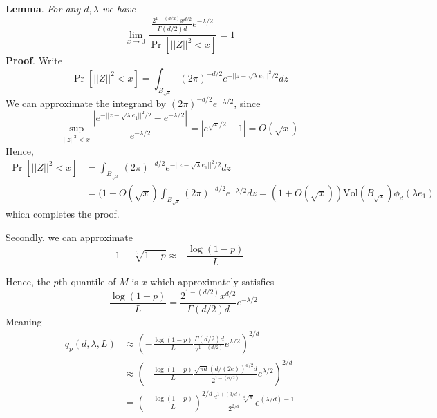 \documentclass[12pt]{article}
\begin{document}
\textbf{Lemma}.
\emph{ For any $d, \lambda$ we have
\[
\lim_{x \to 0} \frac{\frac{2^{1-(d/2)} x^{d/2}}{\Gamma(d/2) d} e^{-\lambda/2}}{\Pr[||Z||^2 < x]} = 1
\]
}
\textbf{Proof}.
Write
\[
\Pr[||Z||^2 < x] = \int_{B_{\sqrt{x}}} (2\pi)^{-d/2} e^{-||z - \sqrt{\lambda} e_1||^2/2} dz
\]
We can approximate the integrand by $(2\pi)^{-d/2} e^{-\lambda/2}$, since
\[
\sup_{||z||^2 < x} \frac{|e^{-||z - \sqrt{\lambda} e_1||^2/2} - e^{-\lambda/2}|}{e^{-\lambda/2}} = |e^{\sqrt{x}/2} - 1| = O(\sqrt{x})
\]
Hence,
\begin{align*}
\Pr[||Z||^2 < x] &= \int_{B_{\sqrt{x}}} (2\pi)^{-d/2} e^{-||z - \sqrt{\lambda} e_1||^2/2} dz
\\&= (1 + O(\sqrt{x})\int_{B_{\sqrt{x}}} (2\pi)^{-d/2} e^{-\lambda/2} dz = (1 + O(\sqrt{x})) \text{Vol}(B_{\sqrt{x}}) \phi_d(\lambda e_1)
\end{align*}
which completes the proof.

Secondly, we can approximate
\[
1-\sqrt[L]{1-p} \approx -\frac{\log(1-p)}{L}
\]

Hence, the $p$th quantile of $M$ is $x$ which approximately satisfies
\[
-\frac{\log(1-p)}{L} = \frac{2^{1-(d/2)} x^{d/2}}{\Gamma(d/2) d} e^{-\lambda/2}
\]
Meaning
\begin{align*}
q_p(d, \lambda, L) &\approx \left(-\frac{\log(1-p)}{L} \frac{\Gamma(d/2) d}{2^{1-(d/2)}} e^{\lambda/2}\right)^{2/d}
\\&\approx \left(-\frac{\log(1-p)}{L} \frac{\sqrt{\pi d} (d/(2e))^{d/2} d}{2^{1-(d/2)}} e^{\lambda/2}\right)^{2/d}
\\&= \left(-\frac{\log(1-p)}{L}\right)^{2/d}
\frac{d^{1 + (3/d)} \sqrt[d]{\pi}}{2^{2/d}}
e^{(\lambda/d) - 1}
\end{align*}
\end{document}
